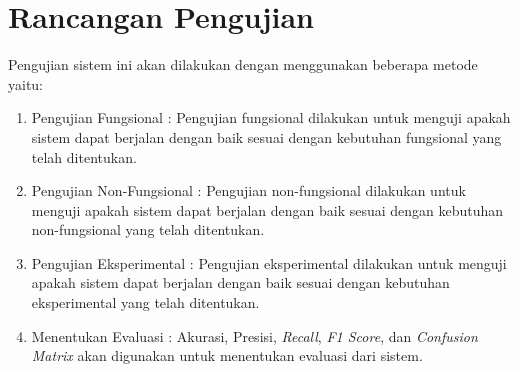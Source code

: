 \section{Rancangan Pengujian}
Pengujian sistem ini akan dilakukan dengan menggunakan beberapa metode yaitu:
\begin{enumerate}
    \item Pengujian Fungsional : Pengujian fungsional dilakukan untuk menguji apakah sistem dapat berjalan dengan baik sesuai dengan kebutuhan fungsional yang telah ditentukan.
    \item Pengujian Non-Fungsional : Pengujian non-fungsional dilakukan untuk menguji apakah sistem dapat berjalan dengan baik sesuai dengan kebutuhan non-fungsional yang telah ditentukan.
    \item Pengujian Eksperimental : Pengujian eksperimental dilakukan untuk menguji apakah sistem dapat berjalan dengan baik sesuai dengan kebutuhan eksperimental yang telah ditentukan.
    \item Menentukan Evaluasi : Akurasi, Presisi, \textit{Recall}, \textit{F1 Score}, dan \textit{Confusion Matrix} akan digunakan untuk menentukan evaluasi dari sistem.
\end{enumerate}
